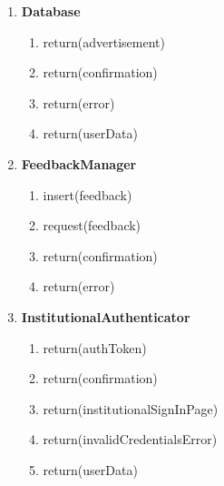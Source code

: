\begin{enumerate}
\begin{enumerate}
    \end{enumerate}
    \item \textbf{Database}
    \begin{enumerate}
        \item return(advertisement)
        \item return(confirmation)
        \item return(error)
        \item return(userData)

    \end{enumerate}
    \item \textbf{FeedbackManager}
    \begin{enumerate}
        \item insert(feedback)
        \item request(feedback)
        \item return(confirmation)
        \item return(error)

    \end{enumerate}
    \item \textbf{InstitutionalAuthenticator}
    \begin{enumerate}
        \item return(authToken)
        \item return(confirmation)
        \item return(institutionalSignInPage)
        \item return(invalidCredentialsError)
        \item return(userData)


\end{enumerate}
\end{enumerate}
